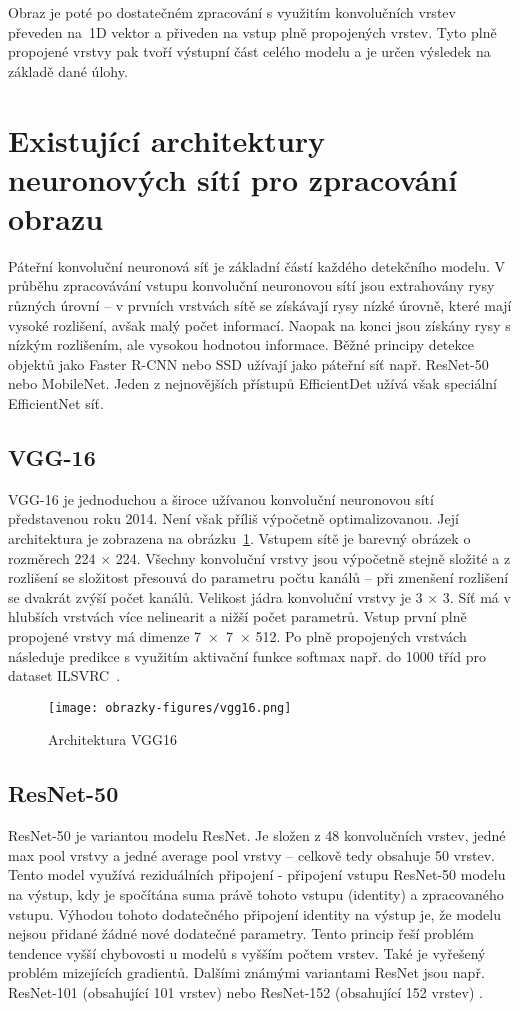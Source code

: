 Obraz je poté po dostatečném zpracování s využitím konvolučních vrstev převeden na~1D vektor a přiveden na vstup plně propojených vrstev. Tyto plně propojené vrstvy pak tvoří výstupní část celého modelu a je určen výsledek na základě dané úlohy.

\section{Existující architektury neuronových sítí pro zpracování obrazu}
Páteřní konvoluční neuronová síť je základní částí každého detekčního modelu. V průběhu zpracovávání vstupu konvoluční neuronovou sítí jsou extrahovány rysy různých úrovní -- v prvních vrstvách sítě se získávají rysy nízké úrovně, které mají vysoké rozlišení, avšak malý počet informací. Naopak na konci jsou získány rysy s nízkým rozlišením, ale vysokou hodnotou informace. Běžné principy detekce objektů jako Faster R-CNN nebo SSD užívají jako páteřní síť např. ResNet-50 nebo MobileNet. Jeden z nejnovějších přístupů EfficientDet užívá však speciální EfficientNet síť.
\subsection{VGG-16}
VGG-16 je jednoduchou a široce užívanou konvoluční neuronovou sítí představenou roku 2014. Není však příliš výpočetně optimalizovanou. Její architektura je zobrazena na obrázku~\ref{fig:vgg}. Vstupem sítě je barevný obrázek o rozměrech 224 $\times$ 224. Všechny konvoluční vrstvy jsou výpočetně stejně složité a z rozlišení se složitost přesouvá do parametru počtu kanálů -- při zmenšení rozlišení se dvakrát zvýší počet kanálů. Velikost jádra konvoluční vrstvy je 3 $\times$ 3. Síť má v hlubších vrstvách více nelinearit a nižší počet parametrů. Vstup první plně propojené vrstvy má dimenze 7~$\times$~7~$\times$ 512. Po plně propojených vrstvách následuje predikce s využitím aktivační funkce softmax např. do 1000 tříd pro dataset ILSVRC~\cite{VGG16}.

\begin{figure}[!htbp]
    \centering
    \texttt{[image: obrazky-figures/vgg16.png]}
    \caption{Architektura VGG16 \cite{VGG16}}
    \label{fig:vgg}
\end{figure}

\subsection{ResNet-50}
ResNet-50 je variantou modelu ResNet. Je složen z 48 konvolučních vrstev, jedné max pool vrstvy a jedné average pool vrstvy -- celkově tedy obsahuje 50 vrstev. Tento model využívá reziduálních připojení - připojení vstupu ResNet-50 modelu na výstup, kdy je spočítána suma právě tohoto vstupu (identity) a zpracovaného vstupu. Výhodou tohoto dodatečného připojení identity na výstup je, že modelu nejsou přidané žádné nové dodatečné parametry. Tento princip řeší problém tendence vyšší chybovosti u modelů s vyšším počtem vrstev. Také je vyřešený problém mizejících gradientů. Dalšími známými variantami ResNet jsou např. ResNet-101 (obsahující 101 vrstev) nebo ResNet-152 (obsahující 152 vrstev) \cite{ResNet50}.
